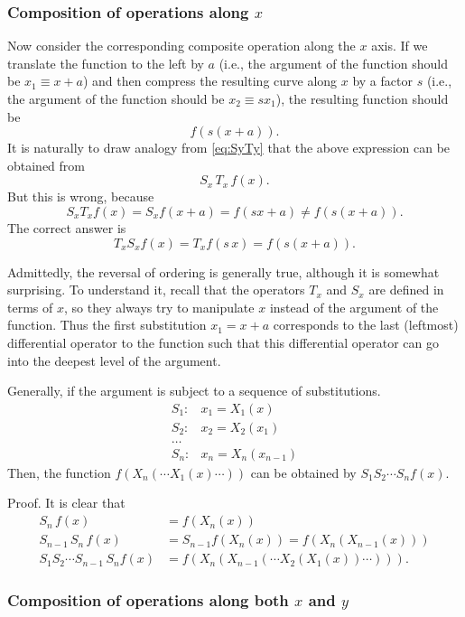 \documentclass{article}
\begin{document}
\subsubsection{Composition of operations along $x$}

Now consider the corresponding composite operation along the $x$ axis.
%
If we translate the function to the left by $a$ (i.e.,
the argument of the function should be $x_1 \equiv x + a$)
and then compress the resulting curve along $x$ by a factor $s$ (i.e.,
the argument of the function should be $x_2 \equiv s x_1$),
the resulting function should be
$$
  f(s(x+a)).
$$
%
It is naturally to draw analogy from \eqref{eq:SyTy} that
the above expression can be obtained from
$$
S_x \, T_x \, f(x).
$$
But this is wrong, because
$$
S_x T_x f(x) = S_x f(x + a) = f(s x + a) \ne f(s (x + a)).
$$
The correct answer is
$$
T_x S_x f(x) = T_x f(s \, x) = f(s (x + a)).
$$

Admittedly, the reversal of ordering is generally true,
although it is somewhat surprising.
To understand it,
recall that the operators $T_x$ and $S_x$
are defined in terms of $x$,
so they always try to manipulate $x$
instead of the argument of the function.
Thus the first substitution $x_1 = x + a$
corresponds to the last (leftmost) differential operator
to the function such that this differential operator
can go into the deepest level of the argument.

Generally, if the argument is subject to a sequence of substitutions.
$$
\begin{aligned}
S_1: & x_1 = X_1(x) \\
S_2: & x_2 = X_2(x_1) \\
\dots \\
S_n: & x_n = X_n(x_{n-1})
\end{aligned}
$$
Then, the function $f(X_n(\cdots X_1(x)\cdots))$
can be obtained by
$S_1 S_2 \cdots S_n f(x)$.

Proof. It is clear that
$$
\begin{aligned}
S_n \, f(x) &= f(X_n(x))
\\
S_{n-1} \, S_n \, f(x) &= S_{n-1} f(X_n(x)) = f(X_n(X_{n-1}(x)))
\\
S_1 S_2 \cdots S_{n-1} \, S_n f(x) &= f(X_n(X_{n-1}(\cdots X_2(X_1(x))\cdots))).
\end{aligned}
$$


\subsubsection{Composition of operations along both $x$ and $y$}
\end{document}
